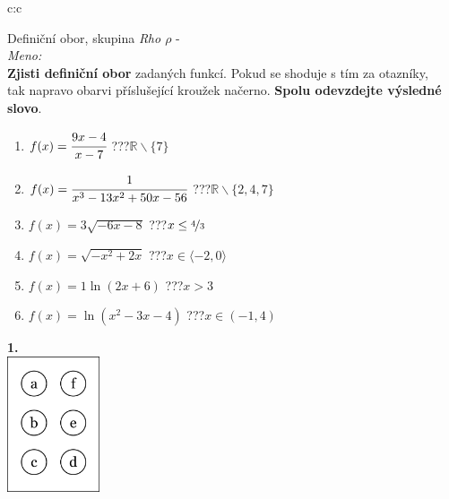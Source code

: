 \documentclass[10pt]{report}
\begin{document}
\begin{tabular}{c:c}
\begin{minipage}[c][99mm][t]{0.49\linewidth}
\begin{center}
\vspace{7mm}
{\huge Definiční obor, skupina \textit{Rho $\rho$} -}\\[4.5mm]
\textit{Meno:}\phantom{xxxxxxxxxxxxxxxxxxxxxxxxxxxxxxxxxxxxxxxxxxxxxxxxxxxxxxxxxxxxxxxxx}\\[3.5mm]
\textbf{Zjisti definiční obor} zadaných funkcí. Pokud se shoduje s tím za otazníky,\\tak napravo obarvi příslušející kroužek načerno. \textbf{Spolu odevzdejte výsledné slovo}.\\[3mm]
\begin{minipage}{0.77\linewidth}
\begin{center}
\begin{varwidth}{\textwidth}
\begin{enumerate}
\normalsize
\item $f(x)=\cfrac{9x-4}{x-7}$\quad \dotfill\; ???\;\dotfill \quad $\mathbb{R}\smallsetminus\{7\}$
\item $f(x)=\cfrac{1}{x^3-13x^2+50x-56}$\quad \dotfill\; ???\;\dotfill \quad $\mathbb{R}\smallsetminus\{2,4,7\}$
\item $f(x)=3\sqrt{-6x-8}$\quad \dotfill\; ???\;\dotfill \quad $x\leq\nicefrac{4}{3}$
\item $f(x)=\sqrt{-x^2+2x}$\quad \dotfill\; ???\;\dotfill \quad $x\in\langle-2 , 0\rangle$
\item $f(x)=1\ln{(2x+6)}$\quad \dotfill\; ???\;\dotfill \quad $x>3$
\item $f(x)=\ln{(x^2-3x-4)}$\quad \dotfill\; ???\;\dotfill \quad $x\in(-1 , 4)$
\end{enumerate}
\end{varwidth}
\end{center}
\end{minipage}
\begin{minipage}{0.20\linewidth}
\begin{center}
{\Huge\bfseries 1.} \\[2mm]
\includegraphics[height=40mm]{../images/braille.png}

\end{center}
\end{minipage}
\end{center}
\end{minipage}
\end{tabular}
\end{document}
